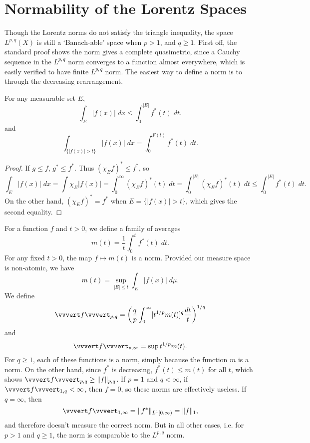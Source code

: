 \section{Normability of the Lorentz Spaces}

Though the Lorentz norms do not satisfy the triangle inequality, the space $L^{p,q}(X)$ is still a `Banach-able' space when $p > 1$, and $q \geq 1$. First off, the standard proof shows the norm gives a complete quasimetric, since a Cauchy sequence in the $L^{p,q}$ norm converges to a function almost everywhere, which is easily verified to have finite $L^{p,q}$ norm. The easiest way to define a norm is to through the decreasing rearrangement.

\begin{lemma}
    For any measurable set $E$,
    \[ \int_E |f(x)|\; dx \leq \int_0^{|E|} f^*(t)\; dt. \]
    and
    \[ \int_{\{ |f(x)| > t \}} |f(x)|\; dx = \int_0^{F(t)} f^*(t)\; dt. \]
\end{lemma}
\begin{proof}
    If $g \leq f$, $g^* \leq f^*$. Thus $(\chi_E f)^* \leq f^*$, so
    \[ \int_E |f(x)|\; dx = \int \chi_E |f(x)| = \int_0^\infty (\chi_E f)^*(t)\; dt = \int_0^{|E|} (\chi_E f)^*(t)\; dt \leq \int_0^{|E|} f^*(t)\; dt. \]
    On the other hand, $(\chi_E f)^* = f^*$ when $E = \{ |f(x)| > t \}$, which gives the second equality.
\end{proof}

For a function $f$ and $t > 0$, we define a family of averages
%
\[ m(t) = \frac{1}{t} \int_0^t f^*(t)\; dt. \]
%
For any fixed $t > 0$, the map $f \mapsto m(t)$ is a norm. Provided our measure space is non-atomic, we have
%
\[ m(t) = \sup_{|E| \leq t} \int_E |f(x)|\; d\mu. \]
%
We define
%
\[ \vvvert f \vvvert_{p,q} = \left( \frac{q}{p} \int_0^\infty [t^{1/p} m(t)]^q \frac{dt}{t} \right)^{1/q} \]
and
%
\[ \vvvert f \vvvert_{p,\infty} = \sup t^{1/p} m(t). \]
%
For $q \geq 1$, each of these functions is a norm, simply because the function $m$ is a norm. On the other hand, since $f^*$ is decreasing, $f^*(t) \leq m(t)$ for all $t$, which shows $\vvvert f \vvvert_{p,q} \geq \| f \|_{p,q}$. If $p = 1$ and $q < \infty$, if $\vvvert f \vvvert_{1,q} < \infty$, then $f = 0$, so these norms are effectively useless. If $q = \infty$, then
%
\[ \vvvert f \vvvert_{1,\infty} = \| f^* \|_{L^1[0,\infty)} = \| f \|_1, \]
%
and therefore doesn't measure the correct norm. But in all other cases, i.e. for $p > 1$ and $q \geq 1$, the norm is comparable to the $L^{p,q}$ norm.

